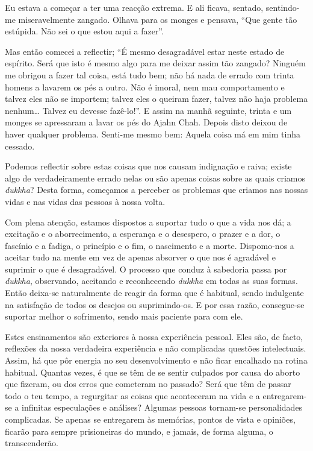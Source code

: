 Eu estava a começar a ter uma reacção extrema. E ali ficava, sentado,
sentindo-me miseravelmente zangado. Olhava para os monges e pensava, “Que gente
tão estúpida. Não sei o que estou aqui a fazer”.

Mas então comecei a reflectir; “É mesmo desagradável estar neste estado de
espírito. Será que isto é mesmo algo para me deixar assim tão zangado? Ninguém
me obrigou a fazer tal coisa, está tudo bem; não há nada de errado com trinta
homens a lavarem os pés a outro. Não é imoral, nem mau comportamento e talvez
eles não se importem; talvez eles o queiram fazer, talvez não haja problema
nenhum\ldots{} Talvez eu devesse fazê-lo!”. E assim na manhã seguinte, trinta e
um monges se apressaram a lavar os pés do Ajahn Chah. Depois disto deixou de
haver qualquer problema. Senti-me mesmo bem: Aquela coisa má em mim tinha
cessado.

Podemos reflectir sobre estas coisas que nos causam indignação e raiva; existe
algo de verdadeiramente errado nelas ou são apenas coisas sobre as quais criamos
\emph{dukkha}? Desta forma, começamos a perceber os problemas que criamos nas
nossas vidas e nas vidas das pessoas à nossa volta.

Com plena atenção, estamos dispostos a suportar tudo o que a vida nos dá; a
excitação e o aborrecimento, a esperança e o desespero, o prazer e a dor, o
fascínio e a fadiga, o princípio e o fim, o nascimento e a morte. Dispomo-nos a
aceitar tudo na mente em vez de apenas absorver o que nos é agradável e suprimir
o que é desagradável. O processo que conduz à sabedoria passa por \emph{dukkha},
observando, aceitando e reconhecendo \emph{dukkha} em todas as suas formas.
Então deixa-se naturalmente de reagir da forma que é habitual, sendo indulgente
na satisfação de todos os desejos ou suprimindo-os. E por essa razão,
consegue-se suportar melhor o sofrimento, sendo mais paciente para com ele.

Estes ensinamentos são exteriores à nossa experiência pessoal. Eles são, de
facto, reflexões da nossa verdadeira experiência e não complicadas questões
intelectuais. Assim, há que pôr energia no seu desenvolvimento e não ficar
encalhado na rotina habitual. Quantas vezes, é que se têm de se sentir culpados
por causa do aborto que fizeram, ou dos erros que cometeram no passado? Será que
têm de passar todo o teu tempo, a regurgitar as coisas que aconteceram na vida e
a entregarem-se a infinitas especulações e análises? Algumas pessoas tornam-se
personalidades complicadas. Se apenas se entregarem às memórias, pontos de vista
e opiniões, ficarão para sempre prisioneiras do mundo, e jamais, de forma
alguma, o transcenderão.

